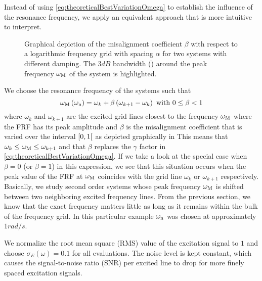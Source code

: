   Instead of using \eqref{eq:theoreticalBestVariationOmega} to establish the influence of the resonance frequency, we apply an equivalent approach that is more intuitive to interpret.


  \begin{figure}
    \centering
    \setlength\figureheight{5cm}
    \setlength{}
    
    \caption[Depiction of the grid misalignment $\beta$ for a logarithmic generalized multisine.]{Graphical depiction of the misalignment coefficient $\beta$ with respect to a logarithmic frequency grid with spacing $\alpha$ for two systems with different damping.
    The $3\unit{dB}$ bandwidth (\sysBW) around the peak frequency $\omega_{\mathrm{M}}$ of the system is highlighted.}
    \label{fig:misalignment-logms}
  \end{figure}


  We choose the resonance frequency of the systems such that
  \begin{equation}
   \omega_{\mathrm{M}}\left( \omega_{\mathrm{n}} \right)  = \omega_k + \beta \left( \omega_{k+1} - \omega_k \right)
   \text{ with } 0 \leq \beta < 1
   \label{eq:chosenVariationOmega}
  \end{equation}
  where $\omega_k$ and $\omega_{k+1}$ are the excited grid lines closest to the frequency $\omega_{\mathrm{M}}$ where the FRF has its peak amplitude and $\beta$ is the misalignment coefficient that is varied over the interval $\left[ 0,1 \right[$ as depicted graphically in 
  This means that $\omega_k \leq \omega_{\mathrm{M}} \leq \omega_{k+1}$ and that $\beta$ replaces the $\gamma$ factor in \eqref{eq:theoreticalBestVariationOmega}.
  If we take a look at the special case when $\beta=0$ (or $\beta=1$) in this expression, we see that this situation occurs when the peak value of the FRF at $\omega_{\mathrm{M}}$ coincides with the grid line $\omega_k$ or $\omega_{k+1}$ respectively.
  Basically, we study second order systems whose peak frequency $\omega_{\mathrm{M}}$ is shifted between two neighboring excited frequency lines.
  From the previous section, we know that the exact frequency matters little as long as it remains within the bulk of the frequency grid.
  In this particular example $\omega_{\mathrm{n}}$ was chosen at approximately $1 \unit{rad/s}$.

  We normalize the root mean square (RMS) value of the excitation signal to $1$ and choose $\sigma_E\left( \omega \right) = 0.1$ for all evaluations.
  The noise level is kept constant, which causes the signal-to-noise ratio (SNR) per excited line to drop for more finely spaced excitation signals.
  
